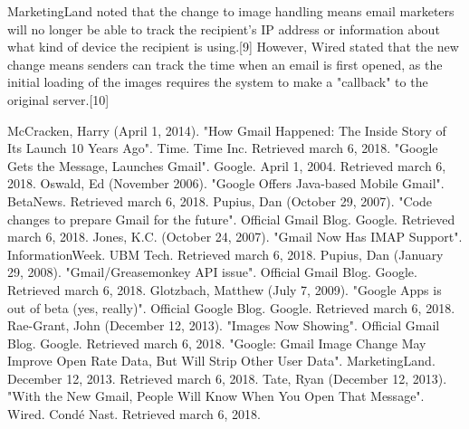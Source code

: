 \documentclass[]{article}
\begin{document}
MarketingLand noted that the change to image handling means email marketers will no longer be able to track the recipient's IP address or information about what kind of device the recipient is using.[9] However, Wired stated that the new change means senders can track the time when an email is first opened, as the initial loading of the images requires the system to make a "callback" to the original server.[10]
\begin{thebibliography}{10}
McCracken, Harry (April 1, 2014). "How Gmail Happened: The Inside Story of Its Launch 10 Years Ago". Time. Time Inc. Retrieved march 6, 2018.
 "Google Gets the Message, Launches Gmail". Google. April 1, 2004. Retrieved march 6, 2018.
Oswald, Ed (November 2006). "Google Offers Java-based Mobile Gmail". BetaNews. Retrieved march 6, 2018.
Pupius, Dan (October 29, 2007). "Code changes to prepare Gmail for the future". Official Gmail Blog. Google. Retrieved march 6, 2018.
Jones, K.C. (October 24, 2007). "Gmail Now Has IMAP Support". InformationWeek. UBM Tech. Retrieved march 6, 2018.
 Pupius, Dan (January 29, 2008). "Gmail/Greasemonkey API issue". Official Gmail Blog. Google. Retrieved march 6, 2018.
Glotzbach, Matthew (July 7, 2009). "Google Apps is out of beta (yes, really)". Official Google Blog. Google. Retrieved march 6, 2018.
 Rae-Grant, John (December 12, 2013). "Images Now Showing". Official Gmail Blog. Google. Retrieved march 6, 2018.
 "Google: Gmail Image Change May Improve Open Rate Data, But Will Strip Other User Data". MarketingLand. December 12, 2013. Retrieved march 6, 2018.
Tate, Ryan (December 12, 2013). "With the New Gmail, People Will Know When You Open That Message". Wired. Condé Nast. Retrieved march 6, 2018.
\end{thebibliography}
\end{document}
